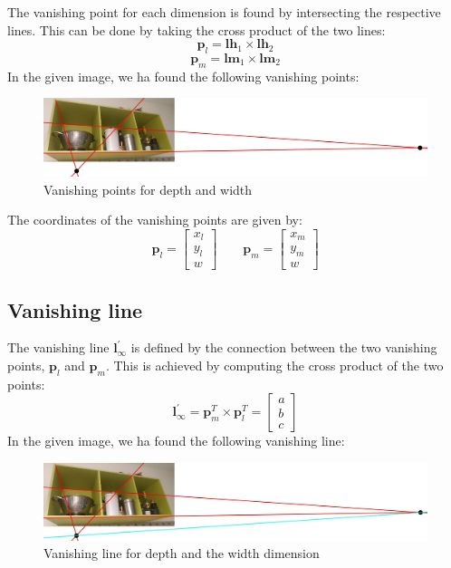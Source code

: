 The vanishing point for each dimension is found by intersecting the respective lines. 
This can be done by taking the cross product of the two lines:
\[\mathbf{p}_l=\mathbf{lh}_1 \times \mathbf{lh}_2\]
\[\mathbf{p}_m=\mathbf{lm}_1 \times \mathbf{lm}_2\]
\noindent In the given image, we ha found the following vanishing points:
\begin{figure}[H]
    \centering
    \includegraphics[width=1\linewidth]{images/vanishing_points.jpg}
    \caption{Vanishing points for depth and width}
\end{figure}
The coordinates of the vanishing points are given by:
\[\mathbf{p}_l=\begin{bmatrix} x_l \\ y_l \\ w \end{bmatrix} \qquad \mathbf{p}_m=\begin{bmatrix} x_m \\ y_m \\ w \end{bmatrix}\]

\subsection{Vanishing line}
The vanishing line $\mathbf{l}^\prime_{\infty}$ is defined by the connection between the two vanishing points, $\mathbf{p}_l$ and $\mathbf{p}_m$. 
This is achieved by computing the cross product of the two points:
\[\mathbf{l}^\prime_{\infty}= \mathbf{p}_m^T \times \mathbf{p}_l^T=\begin{bmatrix} a \\ b \\ c \end{bmatrix}\]
\noindent In the given image, we ha found the following vanishing line:
\begin{figure}[H]
    \centering
    \includegraphics[width=1\linewidth]{images/vanishing_line.jpg}
    \caption{Vanishing line for depth and the width dimension}
\end{figure}